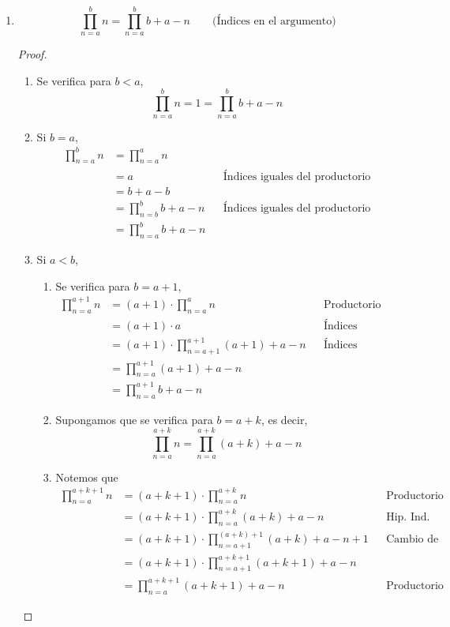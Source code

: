\begin{enumerate}[label=\alph*)]
    \item \[\prod_{n=a}^{b} n = \prod_{n=a}^{b} b+a-n \qquad \text{(Índices en el argumento)}\]
    
    \begin{proof}\leavevmode
      \begin{enumerate}[label=\Roman*)]
        \item Se verifica para $b<a$, \[\prod_{n=a}^{b} n = 1 = \prod_{n=a}^{b} b+a-n\]
        \item Si $b=a$,
        \begin{align*}
          \prod_{n=a}^{b} n &= \prod_{n=a}^{a} n\\
          &= a && \text{Índices iguales del productorio}\\
          &= b + a - b\\
          &= \prod_{n=b}^{b} b+a-n && \text{Índices iguales del productorio}\\
          &= \prod_{n=a}^{b} b + a -n
        \end{align*}
        \item Si $a<b$,
        \begin{enumerate}[label=\roman*)]
          \item Se verifica para $b=a+1$,
          \begin{align*}
            \prod_{n=a}^{a+1} n &= (a+1) \cdot \prod_{n=a}^{a} n && \text{Productorio inverso}\\
            &= (a+1) \cdot a && \text{Índices iguales del productorio}\\
            &= (a+1) \cdot \prod_{n=a+1}^{a+1} (a+1)+a-n && \text{Índices iguales del productorio}\\
            &= \prod_{n=a}^{a+1} (a+1)+a-n\\
            &= \prod_{n=a}^{a+1} b+a-n
          \end{align*}
          \item Supongamos que se verifica para $b=a+k$, es decir,
          \[\prod_{n=a}^{a+k} n = \prod_{n=a}^{a+k} (a+k)+a-n\]
          \item Notemos que
          \begin{align*}
            \prod_{n=a}^{a+k+1} n &= (a+k+1) \cdot \prod_{n=a}^{a+k} n && \text{Productorio inverso}\\
            &= (a+k+1) \cdot \prod_{n=a}^{a+k} (a+k)+a-n && \text{Hip. Ind.}\\
            &= (a+k+1) \cdot \prod_{n=a+1}^{(a+k)+1} (a+k)+a-n+1 && \text{Cambio de índice}\\
            &= (a+k+1) \cdot \prod_{n=a+1}^{a+k+1} (a+k+1)+a-n\\
            &= \prod_{n=a}^{a+k+1} (a+k+1)+a-n && \text{Productorio inverso}
          \end{align*}
        \end{enumerate}
      \end{enumerate}
    \end{proof}
    
\end{enumerate}

